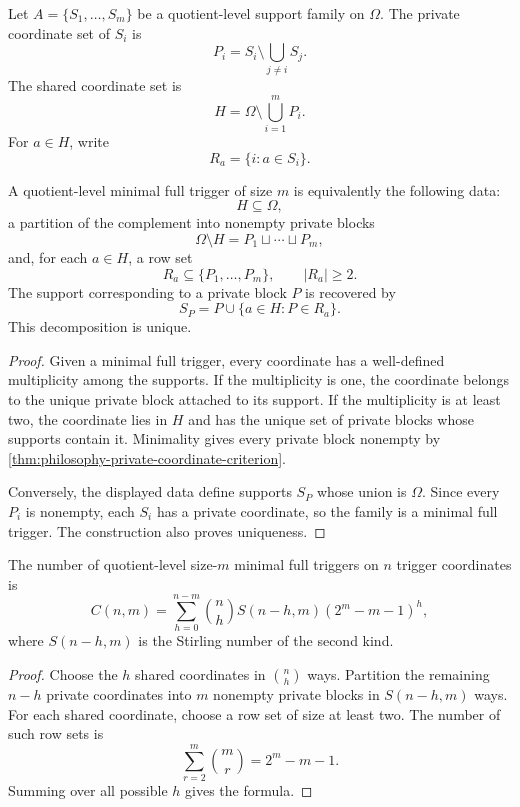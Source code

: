 \begin{definition}
\label{def:philosophy-private-shared-coordinates}
Let $A=\{S_{1},\ldots,S_{m}\}$ be a quotient-level support family on
$\Omega$. The private coordinate set of $S_{i}$ is
$$
  P_{i}
  =
  S_{i}\setminus\bigcup_{j\neq i}S_{j}.
$$
The shared coordinate set is
$$
  H
  =
  \Omega\setminus\bigcup_{i=1}^{m}P_{i}.
$$
For $a\in H$, write
$$
  R_{a}=\{i:a\in S_{i}\}.
$$
\end{definition}

\begin{theorem}
\label{thm:philosophy-private-shared-decomposition}
A quotient-level minimal full trigger of size $m$ is equivalently the
following data:
$$
  H\subseteq\Omega,
$$
a partition of the complement into nonempty private blocks
$$
  \Omega\setminus H=P_{1}\sqcup\cdots\sqcup P_{m},
$$
and, for each $a\in H$, a row set
$$
  R_{a}\subseteq\{P_{1},\ldots,P_{m}\},
  \qquad
  |R_{a}|\geq2.
$$
The support corresponding to a private block $P$ is recovered by
$$
  S_{P}
  =
  P
  \cup
  \{a\in H:P\in R_{a}\}.
$$
This decomposition is unique.
\end{theorem}
\begin{proof}
Given a minimal full trigger, every coordinate has a well-defined
multiplicity among the supports. If the multiplicity is one, the
coordinate belongs to the unique private block attached to its support.
If the
multiplicity is at least two, the coordinate lies in $H$ and has the
unique set of private blocks whose supports contain it. Minimality gives
every private block nonempty by
\autoref{thm:philosophy-private-coordinate-criterion}.

Conversely, the displayed data define supports $S_{P}$ whose union is
$\Omega$. Since every $P_{i}$ is nonempty, each $S_{i}$ has a private
coordinate, so the family is a minimal full trigger. The construction
also proves uniqueness.
\end{proof}

\begin{theorem}
\label{thm:philosophy-private-shared-decoration-enumeration}
The number of quotient-level size-$m$ minimal full triggers on $n$
trigger coordinates is
$$
  C(n,m)
  =
  \sum_{h=0}^{n-m}
  \binom{n}{h}
  S(n-h,m)
  (2^{m}-m-1)^{h},
$$
where $S(n-h,m)$ is the Stirling number of the second kind.
\end{theorem}
\begin{proof}
Choose the $h$ shared coordinates in $\binom{n}{h}$ ways. Partition the
remaining $n-h$ private coordinates into $m$ nonempty private blocks in
$S(n-h,m)$ ways. For each shared coordinate, choose a row set of size at
least two. The number of such row sets is
$$
  \sum_{r=2}^{m}\binom{m}{r}
  =
  2^{m}-m-1.
$$
Summing over all possible $h$ gives the formula.
\end{proof}

